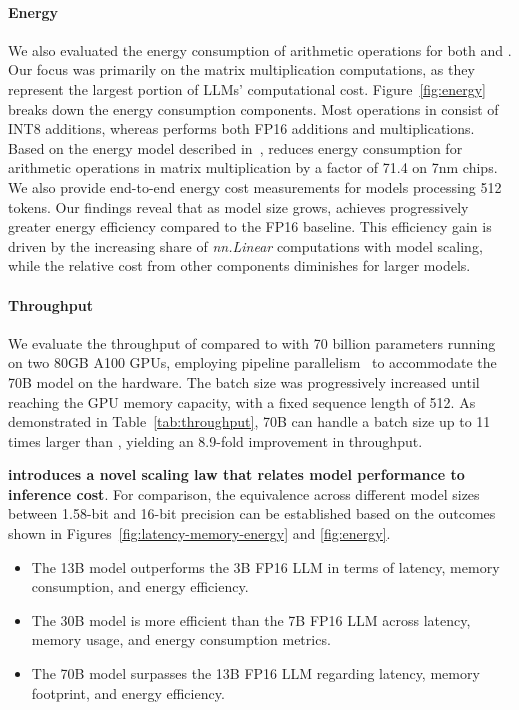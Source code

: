 \paragraph{Energy}

We also evaluated the energy consumption of arithmetic operations for both  and . Our focus was primarily on the matrix multiplication computations, as they represent the largest portion of LLMs' computational cost. Figure~\ref{fig:energy} breaks down the energy consumption components. Most operations in  consist of INT8 additions, whereas  performs both FP16 additions and multiplications. Based on the energy model described in~\cite{energycost, pokebnn},  reduces energy consumption for arithmetic operations in matrix multiplication by a factor of 71.4 on 7nm chips. We also provide end-to-end energy cost measurements for models processing 512 tokens. Our findings reveal that as model size grows,  achieves progressively greater energy efficiency compared to the FP16  baseline. This efficiency gain is driven by the increasing share of \emph{nn.Linear} computations with model scaling, while the relative cost from other components diminishes for larger models.

\paragraph{Throughput}

We evaluate the throughput of  compared to  with 70 billion parameters running on two 80GB A100 GPUs, employing pipeline parallelism~\cite{gpipe} to accommodate the  70B model on the hardware. The batch size was progressively increased until reaching the GPU memory capacity, with a fixed sequence length of 512. As demonstrated in Table~\ref{tab:throughput},  70B can handle a batch size up to 11 times larger than , yielding an 8.9-fold improvement in throughput.

\textbf{ introduces a novel scaling law that relates model performance to inference cost}. For comparison, the equivalence across different model sizes between 1.58-bit and 16-bit precision can be established based on the outcomes shown in Figures~\ref{fig:latency-memory-energy} and \ref{fig:energy}.

\begin{itemize}
    \item The 13B  model outperforms the 3B FP16 LLM in terms of latency, memory consumption, and energy efficiency.
    \item The 30B  model is more efficient than the 7B FP16 LLM across latency, memory usage, and energy consumption metrics.
    \item The 70B  model surpasses the 13B FP16 LLM regarding latency, memory footprint, and energy efficiency.
\end{itemize}

